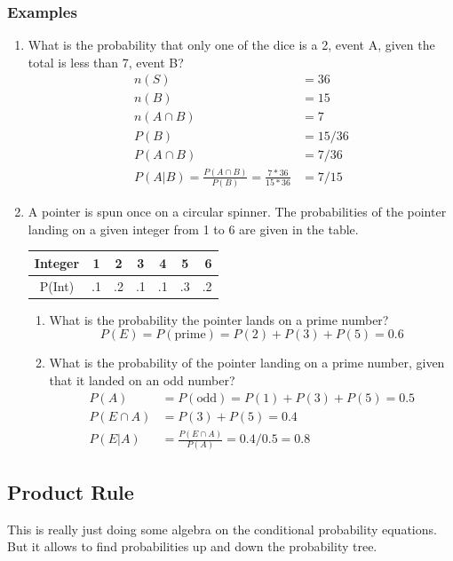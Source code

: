 \documentclass[14pt]{extarticle}
\begin{document}
\subsubsection{Examples}
\begin{enumerate}
	\item What is the probability that only one of the dice is a 2, event A, given the total is less than 7, event B?
	\begin{align*}
		n(S) &= 36 \\
		n(B) &= 15 \\
		n(A \cap B) &= 7 \\
		P(B) &= 15/36  \\
		P(A\cap B)&= 7/36 \\
		P(A|B) = \frac{P(A\cap B)}{P(B)} = \frac{7*36}{15*36} &= 7/15
	\end{align*}

	\item A pointer is spun once on a circular spinner. The probabilities of the pointer landing on a given integer from 1 to 6 are given in the table.
	\\
	\begin{tabular}{|c|c|c|c|c|c|r|}
		\hline
		Integer & 1 & 2 & 3 & 4 & 5 & 6 \\
		\hline
		P(Int) & .1 & .2 & .1 & .1 & .3 & .2 \\
		\hline
	\end{tabular}
	\begin{enumerate}
		\item What is the probability the pointer lands on a prime number?
		$$P(E) = P(\text{prime}) = P(2) +P(3)+P(5) = 0.6$$
		\item What is the probability of the pointer landing on a prime number, given that it landed on an odd number?
		\begin{align*}
			P(A) &= P(\text{odd})=P(1)+P(3)+P(5) = 0.5 \\
			P(E\cap A) &= P(3)+P(5) = 0.4 \\
			P(E|A) &= \frac{P(E\cap A)}{P(A)} = 0.4/0.5 = 0.8
		\end{align*}
	\end{enumerate}
\end{enumerate}

\subsection{Product Rule}
This is really just doing some algebra on the conditional probability equations. But it allows to find probabilities up and down the probability tree.
\end{document}
